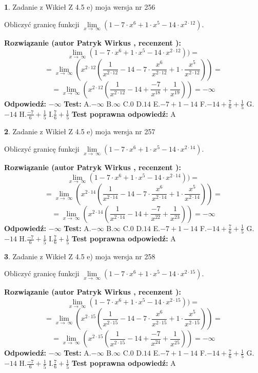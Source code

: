 \documentclass[12pt, a4paper]{article}
\theoremstyle{definition} %
\newtheorem{zad}{}
\newcommand{\zadStart}[1]{\begin{zad}#1\newline}
\newcommand{\zadStop}{\end{zad}}
\newcommand{\rozwStart}[2]{\noindent \textbf{Rozwiązanie (autor #1 , recenzent #2): }\newline}
\newcommand{\rozwStop}{\newline}
\newcommand{\odpStart}{\noindent \textbf{Odpowiedź:}\newline}
\newcommand{\odpStop}{\newline}
\newcommand{\testStart}{\noindent \textbf{Test:}\newline}
\newcommand{\testStop}{\newline}
\newcommand{\kluczStart}{\noindent \textbf{Test poprawna odpowiedź:}\newline}
\newcommand{\kluczStop}{\newline}
\begin{document}
\zadStart{Zadanie z Wikieł Z 4.5 e) moja wersja nr 256}



Obliczyć granicę funkcji  $\lim\limits_{x\to\ \infty}(1 - 7 \cdot x^{6}+1 \cdot x^{5}- 14 \cdot x^{2\cdot12})$.
\zadStop
\rozwStart{Patryk Wirkus}{}
$$\lim\limits_{x\to\ \infty}(1 - 7 \cdot x^{6}+1 \cdot x^{5}- 14 \cdot x^{2\cdot12}))=$$
$$=\lim\limits_{x\to\ \infty}(x^{2\cdot12}(\frac{1}{x^{2\cdot12}}-14 -7 \cdot \frac{x^{6}}{x^{2\cdot12}}+1 \cdot \frac{x^{5}}{x^{2\cdot12}}))=$$
$$=\lim\limits_{x\to\ \infty}(x^{2\cdot12}(\frac{1}{x^{2\cdot12}}-14 + \frac{-7}{x^{18}}+ \frac{1}{x^{19}}))=-\infty$$
\rozwStop
\odpStart
$-\infty$
\odpStop
\testStart
A.$-\infty$ B.$\infty$ C.$0$ D.$14$ E.$-7 + 1 - 14$
F.$-14+\frac{7}{6}+\frac{1}{5}$ G.$-14$
H.$\frac{-7}{6}+\frac{1}{5}$
I.$\frac{7}{6}+\frac{1}{5}$
\testStop
\kluczStart
A
\kluczStop



\zadStart{Zadanie z Wikieł Z 4.5 e) moja wersja nr 257}



Obliczyć granicę funkcji  $\lim\limits_{x\to\ \infty}(1 - 7 \cdot x^{6}+1 \cdot x^{5}- 14 \cdot x^{2\cdot14})$.
\zadStop
\rozwStart{Patryk Wirkus}{}
$$\lim\limits_{x\to\ \infty}(1 - 7 \cdot x^{6}+1 \cdot x^{5}- 14 \cdot x^{2\cdot14}))=$$
$$=\lim\limits_{x\to\ \infty}(x^{2\cdot14}(\frac{1}{x^{2\cdot14}}-14 -7 \cdot \frac{x^{6}}{x^{2\cdot14}}+1 \cdot \frac{x^{5}}{x^{2\cdot14}}))=$$
$$=\lim\limits_{x\to\ \infty}(x^{2\cdot14}(\frac{1}{x^{2\cdot14}}-14 + \frac{-7}{x^{22}}+ \frac{1}{x^{23}}))=-\infty$$
\rozwStop
\odpStart
$-\infty$
\odpStop
\testStart
A.$-\infty$ B.$\infty$ C.$0$ D.$14$ E.$-7 + 1 - 14$
F.$-14+\frac{7}{6}+\frac{1}{5}$ G.$-14$
H.$\frac{-7}{6}+\frac{1}{5}$
I.$\frac{7}{6}+\frac{1}{5}$
\testStop
\kluczStart
A
\kluczStop



\zadStart{Zadanie z Wikieł Z 4.5 e) moja wersja nr 258}



Obliczyć granicę funkcji  $\lim\limits_{x\to\ \infty}(1 - 7 \cdot x^{6}+1 \cdot x^{5}- 14 \cdot x^{2\cdot15})$.
\zadStop
\rozwStart{Patryk Wirkus}{}
$$\lim\limits_{x\to\ \infty}(1 - 7 \cdot x^{6}+1 \cdot x^{5}- 14 \cdot x^{2\cdot15}))=$$
$$=\lim\limits_{x\to\ \infty}(x^{2\cdot15}(\frac{1}{x^{2\cdot15}}-14 -7 \cdot \frac{x^{6}}{x^{2\cdot15}}+1 \cdot \frac{x^{5}}{x^{2\cdot15}}))=$$
$$=\lim\limits_{x\to\ \infty}(x^{2\cdot15}(\frac{1}{x^{2\cdot15}}-14 + \frac{-7}{x^{24}}+ \frac{1}{x^{25}}))=-\infty$$
\rozwStop
\odpStart
$-\infty$
\odpStop
\testStart
A.$-\infty$ B.$\infty$ C.$0$ D.$14$ E.$-7 + 1 - 14$
F.$-14+\frac{7}{6}+\frac{1}{5}$ G.$-14$
H.$\frac{-7}{6}+\frac{1}{5}$
I.$\frac{7}{6}+\frac{1}{5}$
\testStop
\kluczStart
A
\kluczStop
\end{document}
